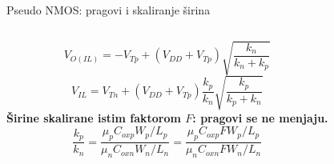 \begin{frame}[label=09_2-s018]{Pseudo NMOS: pragovi i skaliranje širina}
\begin{columns}[T,onlytextwidth]\centering {}\[V_{O(IL)}=-V_{Tp}+(V_{DD}+V_{Tp})\sqrt{\frac{k_n}{k_n+k_p}}\]
\[V_{IL}=V_{Tn}+(V_{DD}+V_{Tp})\frac{k_p}{k_n}\sqrt{\frac{k_p}{k_p+k_n}}\]
\textbf{Širine skalirane istim faktorom $F$: pragovi se ne menjaju.}
\[\frac{k_p}{k_n}=\frac{\mu_pC_{oxp}W_p/L_p}{\mu_nC_{oxn}W_n/L_n}=\frac{\mu_pC_{oxp}FW_p/L_p}{\mu_nC_{oxn}FW_n/L_n}\]
\end{columns}
\end{frame}
